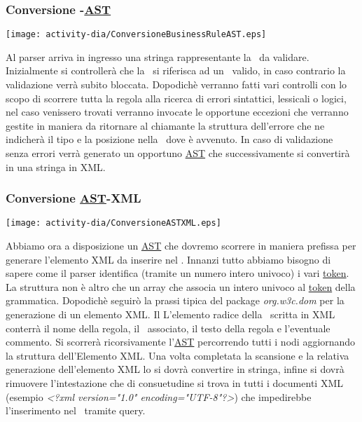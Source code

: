 \subsubsection{Conversione \br -\underline{AST}}
\begin{center}
 \texttt{[image: activity-dia/ConversioneBusinessRuleAST.eps]}
\end{center}
Al parser arriva in ingresso una stringa rappresentante la \br\ da validare. Inizialmente si controller\`a che la \br\ si riferisca ad un \bo\ valido, in caso contrario la validazione verr\`a subito bloccata. Dopodich\`e verranno fatti vari controlli con lo scopo di scorrere tutta la regola alla ricerca di errori sintattici, lessicali o logici, nel caso venissero trovati verranno invocate le opportune eccezioni che verranno gestite in maniera da ritornare al chiamante la struttura dell'errore che ne indicher\`a il tipo e la posizione nella \br\ dove \`e avvenuto. In caso di validazione senza errori verr\`a generato un opportuno \underline{AST} che successivamente si convertir\`a 
in una stringa in XML.


\subsubsection{Conversione \underline{AST}-XML}
\begin{center}
 \texttt{[image: activity-dia/ConversioneASTXML.eps]}
\end{center}
Abbiamo ora a disposizione un \underline{AST} che dovremo scorrere in maniera prefissa per generare l'elemento XML da inserire nel \rp. Innanzi tutto abbiamo bisogno di sapere come il parser identifica (tramite un numero intero univoco) i vari \underline{token}. La struttura non \`e altro che un array che associa un intero univoco al \underline{token} della grammatica. Dopodich\`e seguir\`o la prassi tipica del package \textit{org.w3c.dom} per la generazione di un elemento XML. Il L'elemento radice della \br\ scritta in XML conterr\`a il nome della regola, il \bo\ associato, il testo della regola e l'eventuale commento.
Si scorrer\`a ricorsivamente l'\underline{AST} percorrendo tutti i nodi aggiornando la struttura dell'Elemento XML. Una volta completata la scansione e la relativa generazione dell'elemento XML lo si dovr\`a convertire in stringa, infine si dovr\`a rimuovere l'intestazione che di consuetudine si trova in tutti i documenti XML (esempio \textit{\textless?xml version="1.0" encoding="UTF-8"?\textgreater}) che impedirebbe l'inserimento nel \rp\ tramite query.

